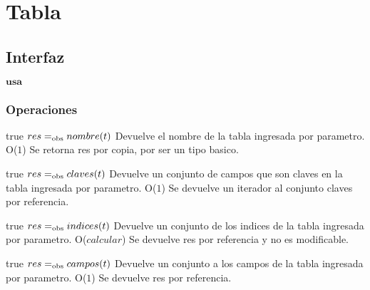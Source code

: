 



\section{Tabla}

\subsection{Interfaz}

$\textbf{usa}$  


\subsubsection*{Operaciones}



 {true}
 {$res =_{\mathrm{obs}} nombre(t)$}
 {Devuelve el nombre de la tabla ingresada por parametro.}
 {O($1$)}
 {Se retorna res por copia, por ser un tipo basico.}

 {true}
 {$res =_{\mathrm{obs}} claves(t)$}
 {Devuelve un conjunto de campos que son claves en la tabla ingresada por parametro.}
 {O($1$)}
 {Se devuelve un iterador al conjunto claves por referencia.}
 
 {true}
 {$res =_{\mathrm{obs}} indices(t)$}
 {Devuelve un conjunto de los indices de la tabla ingresada por parametro.}
 {O($calcular$)}
 {Se devuelve res por referencia y no es modificable.}
 
 {true}
 {$res =_{\mathrm{obs}} campos(t)$}
 {Devuelve un conjunto a los campos de la tabla ingresada por parametro.}
 {O($1$)}
 {Se devuelve res por referencia.}

